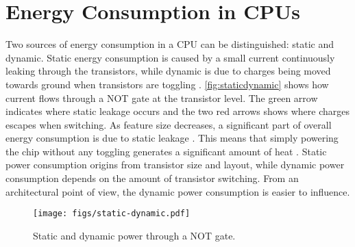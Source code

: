 \section{Energy Consumption in CPUs}

Two sources of energy consumption in a CPU can be distinguished: static and
dynamic. Static energy consumption is caused by a small current continuously
leaking through the transistors, while dynamic is due to charges being moved
towards ground when transistors are toggling \cite{wolf}.
\autoref{fig:staticdynamic} shows how current flows through a NOT gate at the
transistor level. The green arrow indicates where static leakage occurs and the
two red arrows shows where charges escapes when switching. As feature size
decreases, a significant part of overall energy consumption is due to static
leakage \cite{nguyen2003minimization}. This means that simply powering the chip
without any toggling generates a significant amount of heat
\cite{kim2003leakage,martin2002combined}. Static power consumption origins
from transistor size and layout, while dynamic power consumption depends on the
amount of transistor switching. From an architectural point of view, the dynamic
power consumption is easier to influence.

\begin{figure}[tbh]
    \centering
    \texttt{[image: figs/static-dynamic.pdf]}
    \caption{Static and dynamic power through a NOT gate.}
    \label{fig:staticdynamic}
\end{figure}
